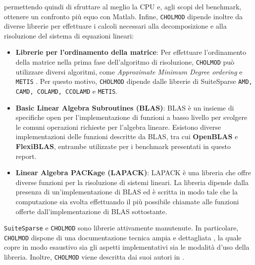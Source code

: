 permettendo quindi di sfruttare al meglio la CPU e, agli scopi del benchmark, ottenere un confronto più equo con Matlab.
Infine, \texttt{CHOLMOD} dipende inoltre da diverse librerie per effettuare i calcoli necessari alla decomposizione e alla risoluzione del sistema di equazioni lineari:
\begin{itemize}
	\item \textbf{Librerie per l'ordinamento della matrice}: Per effettuare l'ordinamento della matrice nella prima fase dell'algoritmo di risoluzione, \texttt{CHOLMOD} può utilizzare diversi algoritmi, come \textit{Approximate Minimum Degree ordering} e \texttt{METIS} \cite{le_fevre_selective_2022}.
	Per questo motivo, \texttt{CHOLMOD} dipende dalle librerie di SuiteSparse \texttt{AMD, CAMD, COLAMD, CCOLAMD} e \texttt{METIS}.
	\item \textbf{Basic Linear Algebra Subroutines (BLAS)}: BLAS \cite{blas_doc} è un insieme di specifiche open per l'implementazione di funzioni a basso livello per svolgere le comuni operazioni richieste per l'algebra lineare.
	Esistono diverse implementazioni delle funzioni descritte da BLAS, tra cui \textbf{OpenBLAS} e \textbf{FlexiBLAS}, entrambe utilizzate per i benchmark presentati in questo report.
	\item \textbf{Linear Algebra PACKage (LAPACK)}: LAPACK \cite{lapack_doc} è una libreria che offre diverse funzioni per la risoluzione di sistemi lineari. La libreria dipende dalla presenza di un'implementazione di BLAS ed è scritta
	in modo tale che la computazione sia svolta effettuando il più possibile chiamate alle funzioni offerte dall'implementazione di BLAS sottostante.
\end{itemize}
\texttt{SuiteSparse} e \texttt{CHOLMOD} sono librerie attivamente manutenute. 
In particolare, \texttt{CHOLMOD} dispone di una documentazione tecnica ampia e dettagliata \cite{cholmod_doc}, la
quale copre in modo esaustivo sia gli aspetti implementativi sia le modalità d'uso della libreria. 
Inoltre, \texttt{CHOLMOD} viene descritta dai suoi autori in \cite{chen_algorithm_2008}.

